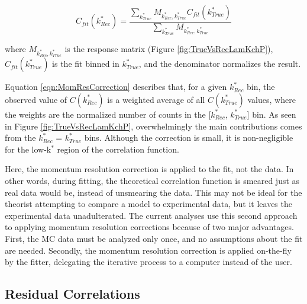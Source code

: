 \documentclass[ALICE,manyauthors]{cernphprep}
\begin{document}
\begin{equation}
  C_{fit}(k^{*}_{Rec}) = \dfrac{\sum\limits_{k^{*}_{True}}M_{k^{*}_{Rec},k^{*}_{True}}C_{fit}(k^{*}_{True})}{\sum\limits_{k^{*}_{True}}M_{k^{*}_{Rec},k^{*}_{True}}}
\label{eqn:MomResCorrection}
\end{equation}

where $M_{k^{*}_{Rec},k^{*}_{True}}$ is the response matrix (Figure \ref{fig:TrueVsRecLamKchP}), $C_{fit}(k^{*}_{True})$ is the fit binned in $k^{*}_{True}$, and the denominator normalizes the result.

Equation \ref{eqn:MomResCorrection} describes that, for a given $k^{*}_{Rec}$ bin, the observed value of $C(k^{*}_{Rec})$ is a weighted average of all $C(k^{*}_{True})$ values, where the weights are the normalized number of counts in the [$k^{*}_{Rec}$, $k^{*}_{True}$] bin.
As seen in Figure \ref{fig:TrueVsRecLamKchP}, overwhelmingly the main contributions comes from the $k^{*}_{Rec}$ = $k^{*}_{True}$ bins.
Although the correction is small, it is non-negligible for the low-k$^{*}$ region of the correlation function.

Here, the momentum resolution correction is applied to the fit, not the data.
In other words, during fitting, the theoretical correlation function is smeared just as real data would be, instead of unsmearing the data.
This may not be ideal for the theorist attempting to compare a model to experimental data, but it leaves the experimental data unadulterated.
The current analyses use this second approach to applying momentum resolution corrections because of two major advantages.  First, the MC data must be analyzed only once, and no assumptions about the fit are needed.  Secondly, the momentum resolution correction is applied on-the-fly by the fitter, delegating the iterative process to a computer instead of the user.



\subsection{Residual Correlations}
\label{ResidualCorrelations}
\end{document}
